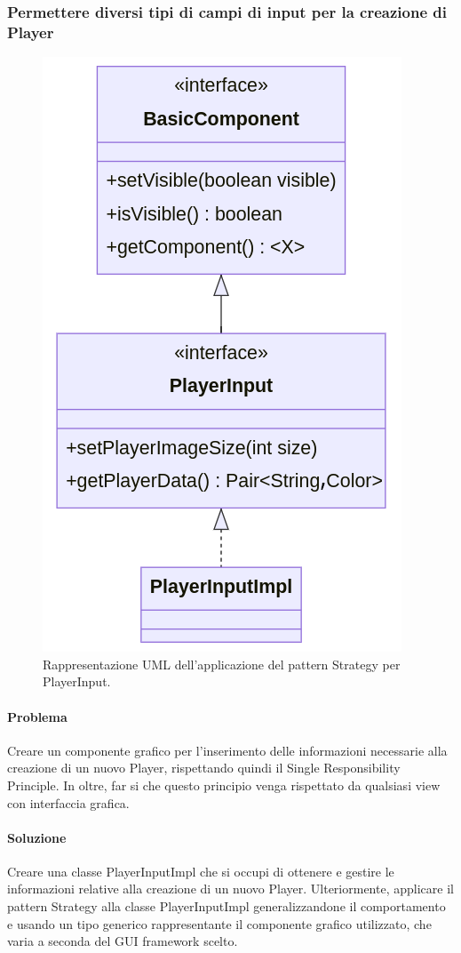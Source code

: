 \subsubsection*{Permettere diversi tipi di campi di input per la creazione di Player}
\begin{figure}[ht]
    \centering\includegraphics[scale=.35]{images/playerinput.png}
    \caption{Rappresentazione UML dell'applicazione del pattern Strategy per PlayerInput.}
\end{figure}
\paragraph{Problema}
Creare un componente grafico per l'inserimento delle informazioni necessarie alla creazione di un nuovo Player, rispettando quindi il Single Responsibility Principle. In oltre, far si che questo principio venga rispettato da qualsiasi view con interfaccia grafica.
\paragraph{Soluzione}
Creare una classe PlayerInputImpl che si occupi di ottenere e gestire le informazioni relative alla creazione di un nuovo Player. Ulteriormente, applicare il pattern Strategy alla classe PlayerInputImpl generalizzandone il comportamento e usando un tipo generico rappresentante il componente grafico utilizzato, che varia a seconda del GUI framework scelto.
\clearpage

